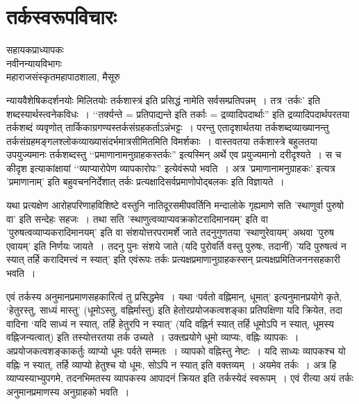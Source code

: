 {\fontsize{15}{17}\selectfont
\chapter{तर्कस्वरूपविचारः}

\begin{center}
\smallskip

सहायकप्राध्यापकः\\
नवीनन्यायविभागः\\
महाराजसंस्कृतमहापाठशाला, मैसूरु
\addrule
\end{center}
न्यायवैशेषिकदर्शनयोः मिलितयोः तर्कशास्त्रं इति प्रसिद्धं नामेति सर्वसम्प्रतिपन्नम्~। तत्र ‘तर्कः' इति शब्दस्यार्थस्त्वनेकविधः~। ‘‘तर्क्यन्ते = प्रतिपाद्यन्ते इति तर्काः = द्रव्यादिपदार्थाः'' इति द्रव्यादिपदार्थपरतया तर्कशब्दं व्यवृणोत् तार्किकाग्रगण्यस्तर्कसंग्रहकर्ताऽन्नंभट्टः~। परन्तु एतादृशार्थतया तर्कशब्दव्याख्यानन्तु तर्कसंग्रहमङ्गलश्लोकव्याख्यासंदर्भमात्रसीमितमिति विमर्शकाः~। वास्तवतया तर्कशास्त्रे बहुलतया उपयुज्यमानः तर्कशब्दस्तु ‘‘प्रमाणानामनुग्राहकस्तर्कः'' इत्यस्मिन् अर्थे एव प्रयुज्यमानो दरीदृश्यते~। स च कीदृश इत्याकांक्षायां ‘‘व्याप्यारोपेण व्यापकारोपः'' इत्येवंरूपो भवति~। अत्र 'प्रमाणानामनुग्राहकः' इत्यत्र 'प्रमाणानाम्' इति बहुवचननिर्देशात् तर्कः प्रत्यक्षादिसर्वप्रमाणोपोद्बलकः इति विज्ञायते~। 

यथा प्रत्यक्षेण आरोहपरिणाहविशिष्टे वस्तुनि नातिदूरसमीपवर्तिनि मन्दालोके गृह्यमाणे सति 'स्थाणुर्वा पुरुषो वा' इति सन्देहः सहजः~। तथा सति 'स्थाणुत्वव्याप्यवक्रकोटरादिमानयम्' इति वा 'पुरुषत्वव्याप्यकरादिमानयम्' इति वा संशयोत्तरपरामर्शे जाते तदनुगुणतया 'स्थाणुरेवायम्' अथवा 'पुरुष एवायम्' इति निर्णयः जायते~। तदनु पुनः संशये जाते (यदि पुरोवर्ति वस्तु पुरुषः, तदानीं) 'यदि पुरुषत्वं न स्यात् तर्हि करादिमत्त्वं न स्यात्' इति एवंरूपः तर्कः प्रत्यक्षप्रमाणानुग्राहकस्सन् प्रत्यक्षप्रमितिजननसहकारी भवति~। 

एवं तर्कस्य अनुमानप्रमाणसहकारित्वं तु प्रसिद्धमेव~। यथा ‘पर्वतो वह्निमान्, धूमात्' इत्यनुमानप्रयोगे कृते, ‘हेतुरस्तु, साध्यं मास्तु' (धूमोऽस्तु, वह्निर्मास्तु) इति हेतोरप्रयोजकत्वशङ्का प्रतिपक्षिणा यदि क्रियेत, तदा वादिना ‘यदि साध्यं न स्यात्, तर्हि हेतुरपि न स्यात्' (यदि वह्निर्न स्यात् तर्हि धूमोऽपि न स्यात्, धूमस्य वह्निजन्यत्वात्) इति तस्योत्तरतया तर्क उच्यते~। उक्तप्रयोगे धूमो व्याप्यः, वह्निः व्यापकः~। अप्रयोजकत्वशङ्काकर्तुः व्याप्यो धूमः पर्वते सम्मतः~। व्यापको वह्निस्तु नेष्टः~। यदि साध्यः व्यापकश्च यो वह्निः न स्यात्, तर्हि व्याप्यो हेतुश्च यो धूमः, सोऽपि न स्यात् इति वक्तव्यम्~। अयमेव तर्कः~। अत्र हि व्याप्यस्याभ्युपगमे, तदनभिमतस्य व्यापकस्य आपादनं क्रियत इति तर्कस्येदं स्वरूपम्~। एवं रीत्या अयं तर्कः अनुमानप्रमाणस्य अनुग्राहको भवति~। 

}
